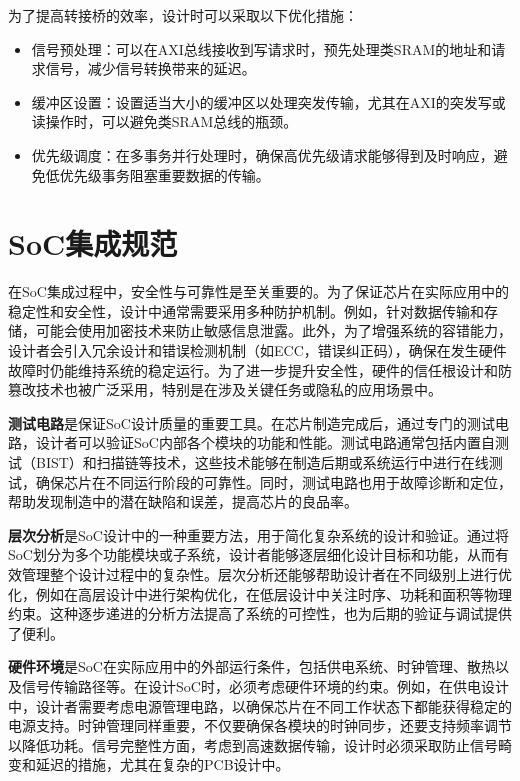 为了提高转接桥的效率，设计时可以采取以下优化措施：

\begin{itemize}
\tightlist
\item
  信号预处理：可以在AXI总线接收到写请求时，预先处理类SRAM的地址和请求信号，减少信号转换带来的延迟。
\item
  缓冲区设置：设置适当大小的缓冲区以处理突发传输，尤其在AXI的突发写或读操作时，可以避免类SRAM总线的瓶颈。
\item
  优先级调度：在多事务并行处理时，确保高优先级请求能够得到及时响应，避免低优先级事务阻塞重要数据的传输。
\end{itemize}

\section{SoC集成规范}\label{sec:08-bus-and-soc-029}

在SoC集成过程中，安全性与可靠性是至关重要的。为了保证芯片在实际应用中的稳定性和安全性，设计中通常需要采用多种防护机制。例如，针对数据传输和存储，可能会使用加密技术来防止敏感信息泄露。此外，为了增强系统的容错能力，设计者会引入冗余设计和错误检测机制（如ECC，错误纠正码），确保在发生硬件故障时仍能维持系统的稳定运行。为了进一步提升安全性，硬件的信任根设计和防篡改技术也被广泛采用，特别是在涉及关键任务或隐私的应用场景中。

\textbf{测试电路}是保证SoC设计质量的重要工具。在芯片制造完成后，通过专门的测试电路，设计者可以验证SoC内部各个模块的功能和性能。测试电路通常包括内置自测试（BIST）和扫描链等技术，这些技术能够在制造后期或系统运行中进行在线测试，确保芯片在不同运行阶段的可靠性。同时，测试电路也用于故障诊断和定位，帮助发现制造中的潜在缺陷和误差，提高芯片的良品率。

\textbf{层次分析}是SoC设计中的一种重要方法，用于简化复杂系统的设计和验证。通过将SoC划分为多个功能模块或子系统，设计者能够逐层细化设计目标和功能，从而有效管理整个设计过程中的复杂性。层次分析还能够帮助设计者在不同级别上进行优化，例如在高层设计中进行架构优化，在低层设计中关注时序、功耗和面积等物理约束。这种逐步递进的分析方法提高了系统的可控性，也为后期的验证与调试提供了便利。

\textbf{硬件环境}是SoC在实际应用中的外部运行条件，包括供电系统、时钟管理、散热以及信号传输路径等。在设计SoC时，必须考虑硬件环境的约束。例如，在供电设计中，设计者需要考虑电源管理电路，以确保芯片在不同工作状态下都能获得稳定的电源支持。时钟管理同样重要，不仅要确保各模块的时钟同步，还要支持频率调节以降低功耗。信号完整性方面，考虑到高速数据传输，设计时必须采取防止信号畸变和延迟的措施，尤其在复杂的PCB设计中。
